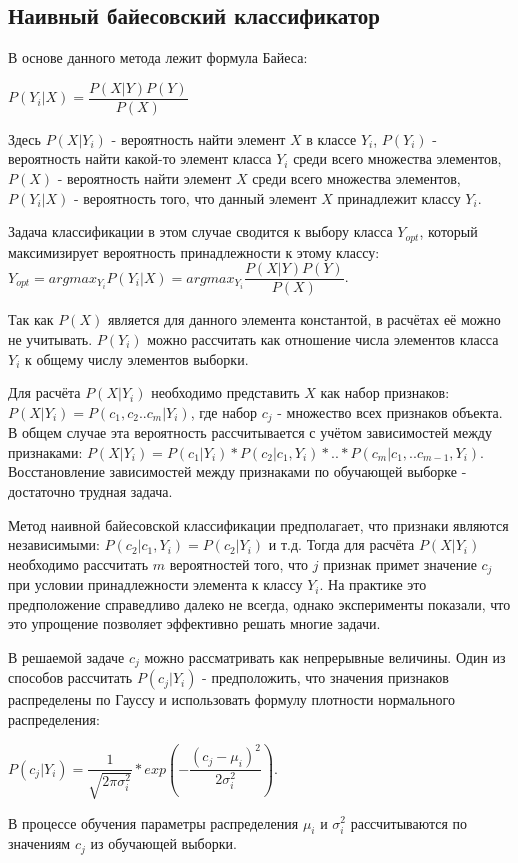\subsection{Наивный байесовский классификатор}

В основе данного метода лежит формула Байеса:

$P(Y_i|X)=\dfrac{P(X|Y)P(Y)}{P(X)}$

Здесь $P(X|Y_i)$ - вероятность найти элемент $X$ в классе $Y_i$, $P(Y_i)$ - вероятность найти какой-то элемент класса $Y_i$ среди всего множества элементов, $P(X)$ - вероятность найти элемент $X$ среди всего множества элементов, $P(Y_i|X)$ - вероятность того, что данный элемент $X$ принадлежит классу $Y_i$.

Задача классификации в этом случае сводится к выбору класса $Y_{opt}$, который максимизирует вероятность принадлежности к этому классу: $Y_{opt}=argmax_{Y_i} P(Y_i|X)=argmax_{Y_i} \dfrac{P(X|Y)P(Y)}{P(X)}$.

Так как $P(X)$ является для данного элемента константой, в расчётах её можно не учитывать. $P(Y_i)$ можно рассчитать как отношение числа элементов класса $Y_i$ к общему числу элементов выборки. 

Для расчёта $P(X|Y_i)$ необходимо представить $X$ как набор признаков: $P(X|Y_i)=P(c_1, c_2 .. c_m | Y_i)$, где набор $c_j$ - множество всех признаков объекта. В общем случае эта вероятность рассчитывается с учётом зависимостей между признаками: $P(X|Y_i)=P(c_1|Y_i)*P(c_2|c_1,Y_i)*..*P(c_m|c_1,..c_{m-1},Y_i)$. Восстановление зависимостей между признаками по обучающей выборке - достаточно трудная задача.

Метод наивной байесовской классификации предполагает, что признаки являются независимыми: $P(c_2|c_1,Y_i)=P(c_2|Y_i)$ и т.д. Тогда для расчёта $P(X|Y_i)$ необходимо рассчитать $m$ вероятностей того, что $j$ признак примет значение $c_j$ при условии принадлежности элемента к классу $Y_i$. На практике это предположение справедливо далеко не всегда, однако эксперименты показали, что это упрощение позволяет эффективно решать многие задачи.

В решаемой задаче $c_j$ можно рассматривать как непрерывные величины. Один из способов рассчитать $P(c_j|Y_i)$ - предположить, что значения признаков распределены по Гауссу и использовать формулу плотности нормального распределения:

$P(c_j|Y_i)=\dfrac{1}{\sqrt{2\pi\sigma_i^2}}*exp(-\dfrac{(c_j-\mu_i)^2}{2\sigma_i^2})$.

В процессе обучения параметры распределения $\mu_i$ и $\sigma_i^2$ рассчитываются по значениям $c_j$ из обучающей выборки. 

